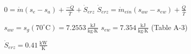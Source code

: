 \( 0 = \dot{m} (s_e - s_a) + \frac{-\dot{Q}}{\bar{T}} + \dot{S}_{erz} \)  
\( \dot{S}_{erz} = \dot{m}_{ein} (s_{aw} - s_{ew}) + \frac{\dot{Q}}{\bar{T}} \)  

\( s_{aw} = s_g (70^\circ \text{C}) = 7.2553 \, \frac{\text{kJ}}{\text{kg·K}} \)  
\( s_{ew} = 7.354 \, \frac{\text{kJ}}{\text{kg·K}} \)  
(Table A-3)  

\( \dot{S}_{erz} = 0.41 \, \frac{\text{kW}}{\text{K}} \)